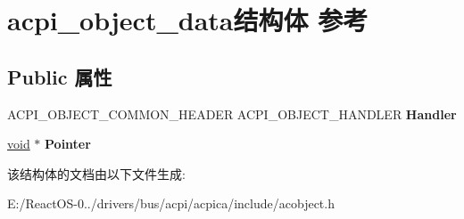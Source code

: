 \hypertarget{structacpi__object__data}{}\section{acpi\+\_\+object\+\_\+data结构体 参考}
\label{structacpi__object__data}
\subsection*{Public 属性}
\begin{DoxyCompactItemize}
\item 
\mbox{\label{structacpi__object__data_a51cd3a6312d3a7d4a83041ede437fc1b}} 
A\+C\+P\+I\+\_\+\+O\+B\+J\+E\+C\+T\+\_\+\+C\+O\+M\+M\+O\+N\+\_\+\+H\+E\+A\+D\+ER A\+C\+P\+I\+\_\+\+O\+B\+J\+E\+C\+T\+\_\+\+H\+A\+N\+D\+L\+ER {\bfseries Handler}
\item 
\mbox{\label{structacpi__object__data_a6734f595a7b43de9eed61478e26e601f}} 
\hyperlink{interfacevoid}{void} $\ast$ {\bfseries Pointer}
\end{DoxyCompactItemize}


该结构体的文档由以下文件生成\+:\begin{DoxyCompactItemize}
\item 
E\+:/\+React\+O\+S-\/0../drivers/bus/acpi/acpica/include/acobject.\+h\end{DoxyCompactItemize}
